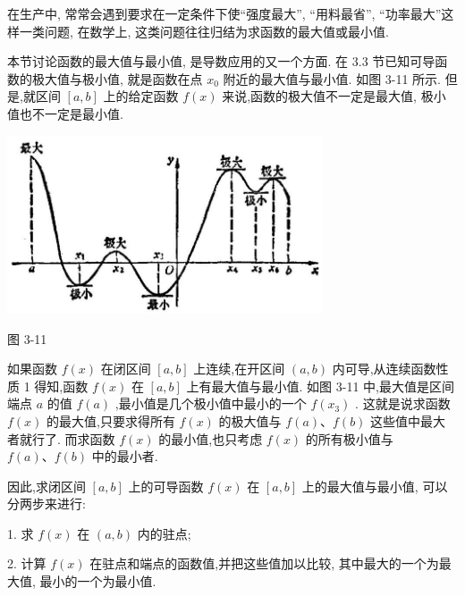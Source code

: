 \documentclass[lang=cn,newtx,10pt,scheme=chinese]{elegantbook}
\begin{document}
在生产中, 常常会遇到要求在一定条件下使“强度最大”, “用料最省”, “功率最大”这样一类问题, 在数学上, 这类问题往往归结为求函数的最大值或最小值.

本节讨论函数的最大值与最小值, 是导数应用的又一个方面. 在 3.3 节已知可导函数的极大值与极小值, 就是函数在点 \({x}_{0}\) 附近的最大值与最小值. 如图 3-11 所示. 但是,就区间 \(\left\lbrack {a,b}\right\rbrack\) 上的给定函数 \(f\left( x\right)\) 来说,函数的极大值不一定是最大值, 极小值也不一定是最小值.

\begin{center}
\includegraphics[max width=0.7\textwidth]{images/01912c18-5c3f-733d-b775-749ba9897a9d_146_522148.jpg}
\end{center}

图 3-11

如果函数 \(f\left( x\right)\) 在闭区间 \(\left\lbrack {a,b}\right\rbrack\) 上连续,在开区间 \(\left( {a,b}\right)\) 内可导,从连续函数性质 1 得知,函数 \(f\left( x\right)\) 在 \(\left\lbrack {a,b}\right\rbrack\) 上有最大值与最小值. 如图 3-11 中,最大值是区间端点 \(a\) 的值 \(f\left( a\right)\) ,最小值是几个极小值中最小的一个 \(f\left( {x}_{3}\right)\) . 这就是说求函数 \(f\left( x\right)\) 的最大值,只要求得所有 \(f\left( x\right)\) 的极大值与 \(f\left( a\right) \text{、}f\left( b\right)\) 这些值中最大者就行了. 而求函数 \(f\left( x\right)\) 的最小值,也只考虑 \(f\left( x\right)\) 的所有极小值与 \(f\left( a\right) \text{、}f\left( b\right)\) 中的最小者.

\begin{proposition}[函数最值求法]

因此,求闭区间 \(\left\lbrack {a,b}\right\rbrack\) 上的可导函数 \(f\left( x\right)\) 在 \(\left\lbrack {a,b}\right\rbrack\) 上的最大值与最小值, 可以分两步来进行:

1. 求 \(f\left( x\right)\) 在 \(\left( {a,b}\right)\) 内的驻点;

2. 计算 \(f\left( x\right)\) 在驻点和端点的函数值,并把这些值加以比较, 其中最大的一个为最大值, 最小的一个为最小值.

\end{proposition}
\end{document}
